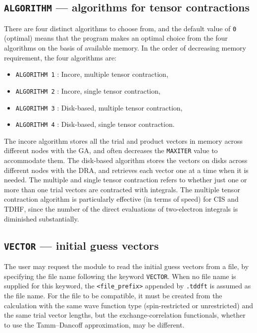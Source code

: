 \subsection{{\tt ALGORITHM} --- algorithms for tensor contractions}

There are four distinct algorithms to choose from, and the default value
of \verb+0+ (optimal) means that the program makes an optimal choice from the four
algorithms on the basis of available memory.  In the order of decreasing memory requirement,
the four algorithms are:
\begin{itemize}
\item \verb+ALGORITHM 1+ : Incore, multiple tensor contraction,
\item \verb+ALGORITHM 2+ : Incore, single tensor contraction,
\item \verb+ALGORITHM 3+ : Disk-based, multiple tensor contraction,
\item \verb+ALGORITHM 4+ : Disk-based, single tensor contraction.
\end{itemize}
The incore algorithm stores all the trial and product vectors in memory across
different nodes with the GA,
and often decreases the \verb+MAXITER+ value to accommodate them.  The disk-based
algorithm stores the vectors on disks across different nodes with the DRA, and
retrieves each vector one at a time when it is needed.  The multiple and single
tensor contraction refers to whether just one or more than one trial vectors
are contracted with integrals.  The multiple tensor contraction algorithm is 
particularly effective (in terms of speed) for CIS and TDHF, since the number of 
the direct evaluations of two-electron integrals is diminished substantially.

\subsection{{\tt VECTOR} --- initial guess vectors}

The user may request the module to read the initial guess vectors from a file,
by specifying the file name following the keyword \verb+VECTOR+.  When no file name
is supplied for this keyword, the \verb+<file_prefix>+ appended by \verb+.tddft+ is assumed as 
the file name.  For the file to be compatible, it must be created from the calculation
with the same wave function type (spin-restricted or unrestricted) and the same trial
vector lengths, but the exchange-correlation functionals, 
whether to use the Tamm--Dancoff approximation,
may be different.

